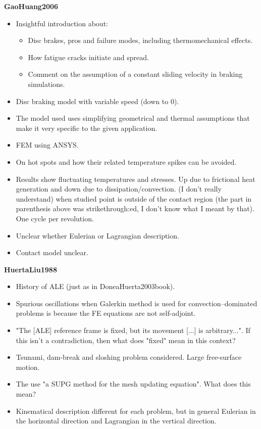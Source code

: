 \documentclass{article}
\begin{document}
\textbf{GaoHuang2006}
\begin{itemize}
\item Insightful introduction about:
\begin{itemize}
\item Disc brakes, pros and failure modes, including thermomechanical effects.
\item How fatigue cracks initiate and spread.
\item Comment on the assumption of a constant sliding velocity in braking simulations.
\end{itemize}
\item Disc braking model with variable speed (down to 0).
\item The model used uses simplifying geometrical and thermal assumptions that make it very specific to the given application.
\item FEM using ANSYS.
\item On hot spots and how their related temperature spikes can be avoided.
\item Results show fluctuating temperatures and stresses. Up due to frictional heat generation and down due to dissipation/convection. (I don't really understand) when studied point is outside of the contact region (the part in parenthesis above was strikethrough:ed, I don't know what I meant by that). One cycle per revolution.
\item Unclear whether Eulerian or Lagrangian description.
\item Contact model unclear.
\end{itemize}


\textbf{HuertaLiu1988}
\begin{itemize}
\item History of ALE (just as in DoneaHuerta2003book).
\item Spurious oscillations when Galerkin method is used for convection--dominated problems is because the FE equations are not self-adjoint.
\item "The [ALE] reference frame is fixed, but its movement [...] is arbitrary...". If this isn't a contradiction, then what does "fixed" mean in this context?
\item Tsunami, dam-break and sloshing problem considered. Large free-surface motion.
\item The use "a SUPG method for the mesh updating equation". What does this mean?
\item Kinematical description different for each problem, but in general Eulerian in the horizontal direction and Lagrangian in the vertical direction.
\end{itemize}
\end{document}
